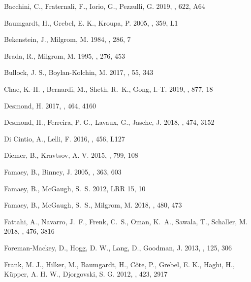 \documentclass[twocolumn,tighten]{aastex63}
\begin{document}
\begin{thebibliography}{}

 {{Bacchini}, C.}, {{Fraternali}, F.}, {{Iorio}, G.}, {{Pezzulli}, G.} 2019, {\aap}, {622}, {A64}

 {{Baumgardt}, H.}, {{Grebel}, E. K.}, {{Kroupa}, P.} 2005, \mnras, 359, L1
  
 {{Bekenstein}, J.}, {{Milgrom}, M.} 1984, {\apj}, {286}, 7 

 {{Brada}, R.}, {{Milgrom}, M.} 1995, {\mnras}, {276}, {453}

 {{Bullock}, J. S.}, {{Boylan-Kolchin}, M.} 2017, {\araa}, {55}, {343}

 {{Chae}, K.-H.} , {{Bernardi}, M.}, {{Sheth}, R.~K.}, {{Gong}, I.-T.} 2019, {\apj}, {877}, {18}

 {{Desmond}, H.} 2017, {\mnras}, {464}, {4160}
  
 {{Desmond}, H.}, {{Ferreira}, P. G.}, {{Lavaux}, G.}, {{Jasche}, J.} 2018, {\mnras}, {474}, {3152}

 {{Di Cintio}, A.}, {{Lelli}, F.} 2016, {\mnras}, {456}, {L127}

 Diemer, B., Kravtsov, A. V. 2015, \apj, 799, 108

 Famaey, B., Binney, J. 2005, \mnras, 363, 603

 {{Famaey}, B.}, {{McGaugh}, S.~S.} 2012, {LRR} {15}, {10}

 {{Famaey}, B.}, {{McGaugh}, S.~S.}, {{Milgrom}, M.} 2018, {\mnras}, {480}, {473}

 {{Fattahi}, A.}, {{Navarro}, J.~F.}, {{Frenk}, C.~S.}, {{Oman}, K.~A.}, {{Sawala}, T.}, {{Schaller}, M.} 2018, \mnras, {476}, {3816}
  
 Foreman-Mackey, D., Hogg, D. W., Lang, D., Goodman, J. 2013, \pasp, 125, 306 

 {{Frank}, M. J.}, {{Hilker}, M.}, {{Baumgardt}, H.}, {{C\^{o}te}, P.}, {{Grebel}, E. K.}, {{Haghi}, H.}, {{K\"{u}pper}, A. H. W.}, {{Djorgovski}, S. G.} 2012, \mnras, 423, 2917
  

\end{thebibliography}
\end{document}
